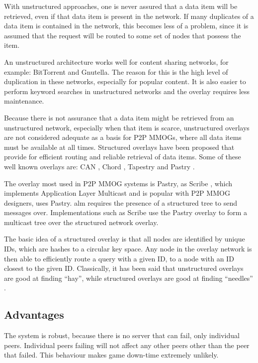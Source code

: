 \documentclass[10pt,a4paper,journal,cspaper,compsoc]{IEEEtran}
\begin{document}
With unstructured approaches, one is never assured that a data item will be retrieved, even if that data item is present in the network. If many
duplicates of a data item is contained in the network, this becomes less of a problem, since it is assumed that the request will be routed to some
set of nodes that possess the item.

An unstructured architecture works well for content sharing networks, for example: BitTorrent and Gnutella. The reason for this is the high level of
duplication in these networks, especially for popular content. It is also easier to perform keyword searches in unstructured networks and the overlay
requires less maintenance.

Because there is not assurance that a data item might be retrieved from an unstructured network, especially when that item is scarce, unstructured
overlays are not considered adequate as a basis for P2P MMOGs, where all data items must be available at all times. Structured overlays have been
proposed that provide for efficient routing and reliable retrieval of data items. Some of these well known overlays are: CAN \cite{CAN}, Chord
\cite{chord}, Tapestry \cite{tapestry} and Pastry \cite{pastry}.

The overlay most used in P2P MMOG systems is Pastry, as Scribe \cite{scribe}, which implements Application Layer Multicast and is popular with P2P
MMOG designers, uses Pastry. \ac{alm} requires the presence of a structured tree to send messages over. Implementations such as Scribe use the Pastry
overlay to form a multicast tree over the structured network overlay.

The basic idea of a structured overlay is that all nodes are identified by unique IDs, which are hashes to a circular key space. Any node in the
overlay network is then able to efficiently route a query with a given ID, to a node with an ID closest to the given ID. Classically, it has been
said that unstructured overlays are good at finding ``hay'', while structured overlays are good at finding ``needles''
\cite{Rodrigues_acm_comms_p2p}.

\subsection{Advantages}
\label{p2p_advantages}

The system is robust, because there is no server that can fail, only individual peers. Individual peers failing will not affect any other peers other
than the peer that failed. This behaviour makes game down-time extremely unlikely.
\end{document}
